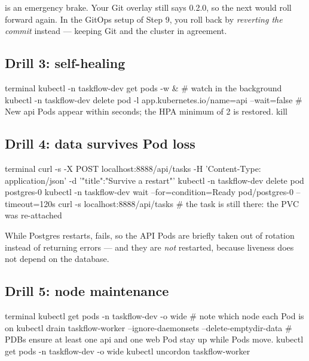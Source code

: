 \begin{keyidea}
 is an emergency brake. Your Git overlay still says 0.2.0, so
the next  would roll forward again. In the GitOps setup of Step 9,
you roll back by \emph{reverting the commit} instead --- keeping Git and the
cluster in agreement.
\end{keyidea}

\subsection{Drill 3: self-healing}

\begin{bashcode}{terminal}
kubectl -n taskflow-dev get pods -w &                       # watch in the background
kubectl -n taskflow-dev delete pod -l app.kubernetes.io/name=api --wait=false
# New api Pods appear within seconds; the HPA minimum of 2 is restored.
kill %
\end{bashcode}

\subsection{Drill 4: data survives Pod loss}

\begin{bashcode}{terminal}
curl -s -X POST localhost:8888/api/tasks -H 'Content-Type: application/json' -d '{"title":"Survive a restart"}'
kubectl -n taskflow-dev delete pod postgres-0
kubectl -n taskflow-dev wait --for=condition=Ready pod/postgres-0 --timeout=120s
curl -s localhost:8888/api/tasks                  # the task is still there: the PVC was re-attached
\end{bashcode}

While Postgres restarts,  fails, so the API Pods are briefly taken
out of rotation instead of returning errors --- and they are \emph{not}
restarted, because liveness does not depend on the database.

\subsection{Drill 5: node maintenance}

\begin{bashcode}{terminal}
kubectl get pods -n taskflow-dev -o wide          # note which node each Pod is on
kubectl drain taskflow-worker --ignore-daemonsets --delete-emptydir-data
# PDBs ensure at least one api and one web Pod stay up while Pods move.
kubectl get pods -n taskflow-dev -o wide
kubectl uncordon taskflow-worker
\end{bashcode}


